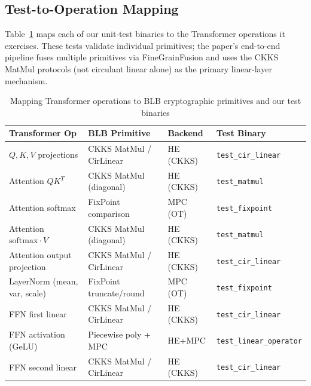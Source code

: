 \subsection{Test-to-Operation Mapping}\label{ssec:test-mapping}

Table~\ref{tab:transformer-mapping} maps each of our unit-test binaries to the Transformer operations it exercises.
These tests validate individual primitives; the paper's end-to-end pipeline fuses multiple primitives via FineGrainFusion and uses the CKKS MatMul protocols (not circulant linear alone) as the primary linear-layer mechanism.

\begin{table}[ht]
\centering
\caption{Mapping Transformer operations to BLB cryptographic primitives and our test binaries}
\label{tab:transformer-mapping}
\begin{tabular}{p{4cm}p{3.5cm}p{2.5cm}p{3cm}}
\toprule
\textbf{Transformer Op} & \textbf{BLB Primitive} & \textbf{Backend} & \textbf{Test Binary} \\
\midrule
$Q, K, V$ projections        & CKKS MatMul / CirLinear & HE (CKKS)   & \texttt{test\_cir\_linear} \\
Attention $QK^T$              & CKKS MatMul (diagonal)  & HE (CKKS)   & \texttt{test\_matmul} \\
Attention softmax             & FixPoint comparison      & MPC (OT)    & \texttt{test\_fixpoint} \\
Attention $\text{softmax} \cdot V$ & CKKS MatMul (diagonal) & HE (CKKS) & \texttt{test\_matmul} \\
Attention output projection   & CKKS MatMul / CirLinear & HE (CKKS)   & \texttt{test\_cir\_linear} \\
LayerNorm (mean, var, scale)  & FixPoint truncate/round  & MPC (OT)    & \texttt{test\_fixpoint} \\
FFN first linear              & CKKS MatMul / CirLinear & HE (CKKS)   & \texttt{test\_cir\_linear} \\
FFN activation (GeLU)         & Piecewise poly + MPC     & HE+MPC      & \texttt{test\_linear\_operator} \\
FFN second linear             & CKKS MatMul / CirLinear & HE (CKKS)   & \texttt{test\_cir\_linear} \\
\bottomrule
\end{tabular}
\end{table}

